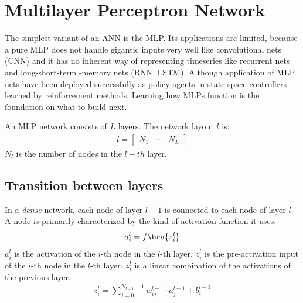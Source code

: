 \chapter{Multilayer Perceptron Network}
The simplest variant of an ANN is the MLP. Its applications are limited, because a pure MLP does not handle gigantic inputs very well like convolutional nets (CNN) and it has no inherent way of representing timeseries like recurrent nets and long-short-term -memory nets (RNN, LSTM). Although application of MLP nets have been deployed successfully as policy agents in state space controllers learned by reinforcement methods. Learning how MLPs function is the foundation on what to build next.\par
An MLP network consists of $L$ layers. The network layout $l$  is:
\begin{align}
	l = \begin{bmatrix}N_1&\cdots&N_{L}\end{bmatrix}
\end{align}
$N_l$ is the number of nodes in the $l-th$ layer.
\section{Transition between layers}
In a \textit{dense} network, each node of layer $l-1$ is connected to each node of layer $l$. A node is primarily characterized by the kind of activation function it uses.
\begin{align}
	\label{eq:activations}
	a_i^{l} =f\bra{z_i^{l}}
\end{align}
$a_i^{l}$ is the activation of the $i$-th node in the $l$-th layer. $z_i^{l}$ is the pre-activation input of the $i$-th node in the $l$-th layer. $z_i^{l}$ is a linear combination of the activations of the previous layer.
\begin{align}
	\label{eq:preactivationinput}
	z_i^{l}=\sum\limits_{j=0}^{N_{l-1}-1}w_{ij}^{l-1}\cdot a_j^{l-1}+b_i^{l-1}
\end{align}

